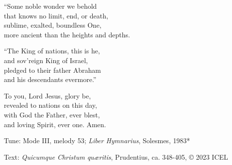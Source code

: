 \hymn



\begin{underhymnverse}
“Some noble wonder we behold\\
that knows no limit, end, or death,\\
sublime, exalted, boundless One,\\
more ancient than the heights and depths.

“The King of nations, this is he,\\
and sov’reign King of Israel,\\
pledged to their father Abraham\\
and his descendants evermore.”

To you, Lord Jesus, glory be,\\
revealed to nations on this day,\\
with God the Father, ever blest,\\
and loving Spirit, ever one. Amen.
\end{underhymnverse}

\begin{hymnsource}
Tune: Mode III, melody 53; \emph{Liber Hymnarius}, Solesmes, 1983*

Text: \emph{Quicumque Christum quæritis}, Prudentius, ca. 348-405, © 2023 ICEL
\end{hymnsource}
